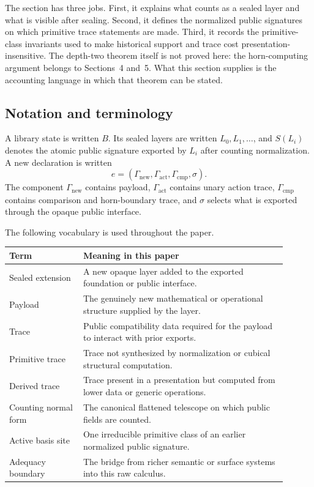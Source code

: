 \documentclass{lmcs}
\begin{document}
The section has three jobs.  First, it explains what counts as a sealed layer and what is
visible after sealing.  Second, it defines the normalized public signatures on which
primitive trace statements are made.  Third, it records the primitive-class invariants used
to make historical support and trace cost presentation-insensitive.  The depth-two theorem
itself is not proved here: the horn-computing
argument belongs to Sections~4 and~5.  What this section supplies is the accounting language
in which that theorem can be stated.

\subsection{Notation and terminology}

A library state is written \(B\).  Its sealed layers are written \(L_0,L_1,\ldots\), and
\(S(L_i)\) denotes the atomic public signature exported by \(L_i\) after counting
normalization.  A new declaration is written
\[
  e=(\Gamma_{\mathrm{new}},\Gamma_{\mathrm{act}},\Gamma_{\mathrm{cmp}},\sigma).
\]
The component \(\Gamma_{\mathrm{new}}\) contains payload, \(\Gamma_{\mathrm{act}}\) contains
unary action trace, \(\Gamma_{\mathrm{cmp}}\) contains comparison and horn-boundary trace, and
\(\sigma\) selects what is exported through the opaque public interface.

The following vocabulary is used throughout the paper.

\begin{center}
\begin{tabular}{p{0.24\linewidth}p{0.66\linewidth}}
\hline
Term & Meaning in this paper \\
\hline
Sealed extension & A new opaque layer added to the exported foundation or public interface. \\
Payload & The genuinely new mathematical or operational structure supplied by the layer. \\
Trace & Public compatibility data required for the payload to interact with prior exports. \\
Primitive trace & Trace not synthesized by normalization or cubical structural computation. \\
Derived trace & Trace present in a presentation but computed from lower data or generic operations. \\
Counting normal form & The canonical flattened telescope on which public fields are counted. \\
Active basis site & One irreducible primitive class of an earlier normalized public signature. \\
Adequacy boundary & The bridge from richer semantic or surface systems into this raw calculus. \\
\hline
\end{tabular}
\end{center}
\end{document}
